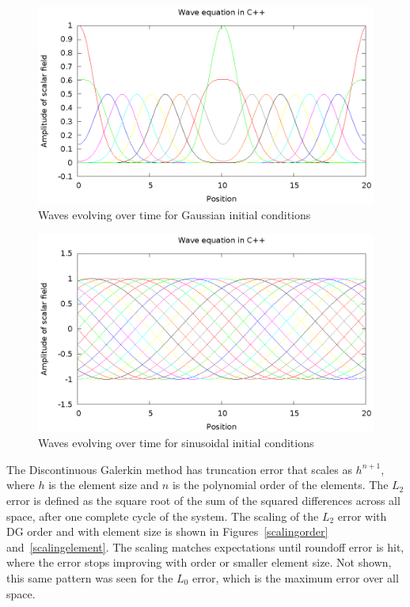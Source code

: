 \begin{figure}
  \includegraphics{gaussWave}
  \caption{Waves evolving over time for Gaussian initial conditions}
  \label{gaussWave}
\end{figure}

\begin{figure}
  \includegraphics{sineWave}
  \caption{Waves evolving over time for sinusoidal initial conditions}
  \label{sineWave}
\end{figure}

The Discontinuous Galerkin method has truncation error that scales as $h^{n+1}$, where $h$ is the element size and $n$ is the polynomial order of the elements. The $L_2$ error is defined as the square root of the sum of the squared differences across all space, after one complete cycle of the system. The scaling of the $L_2$ error with DG order and with element size is shown in Figures~\ref{scalingorder} and~\ref{scalingelement}. The scaling matches expectations until roundoff error is hit, where the error stops improving with order or smaller element size. Not shown, this same pattern was seen for the $L_0$ error, which is the maximum error over all space.

